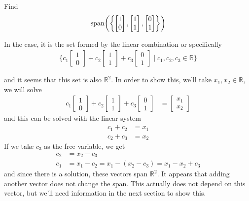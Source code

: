 \begin{example} \label{ex:span:3}
Find 
%
\begin{align*}
\operatorname{span}\biggl( \biggl\{ \begin{bmatrix}
1 \\ 0 
\end{bmatrix}, \begin{bmatrix}
1 \\ 1
\end{bmatrix}, \begin{bmatrix}
0 \\1 
\end{bmatrix} \biggr\} \biggr)
\end{align*}

\solution

In the case, it is the set formed by the linear combination or specifically 
%
\begin{align*}
\{ c_1 \begin{bmatrix}
1 \\ 0
\end{bmatrix} + c_2 \begin{bmatrix}
1 \\ 1
\end{bmatrix}  + c_3 \begin{bmatrix}
0 \\ 1
\end{bmatrix} \; | \; c_1, c_2, c_3 \in \mathbb{R} \} 
\end{align*}

and it seems that this set is also $\mathbb{R}^2$.  In order to show this, we'll take $x_1, x_2 \in \mathbb{R}$, we will solve
%
\begin{align*}
c_1 \begin{bmatrix}
1 \\ 0
\end{bmatrix} + c_2 \begin{bmatrix}
1 \\ 1
\end{bmatrix}  + c_3 \begin{bmatrix}
0 \\ 1
\end{bmatrix} & = \begin{bmatrix}
x_1 \\ x_2 
\end{bmatrix}
\end{align*}
and this can be solved with the linear system
%
\begin{align*}
c_1 + c_2 & = x_1 \\
c_2 + c_3 & = x_2 
\end{align*}
If we take $c_3$ as the free variable, we get
%
\begin{align*}
c_2 & = x_2 - c_3 \\
c_1 & = x_1 -c_2 = x_1 - (x_2-c_3) = x_1 - x_2 + c_3 
\end{align*}
and since there is a solution, these vectors span $\mathbb{R}^2$.    It appears that adding another vector does not change the span.  This actually does not depend on this vector, but we'll need information in the next section to show this.  

\end{example}


